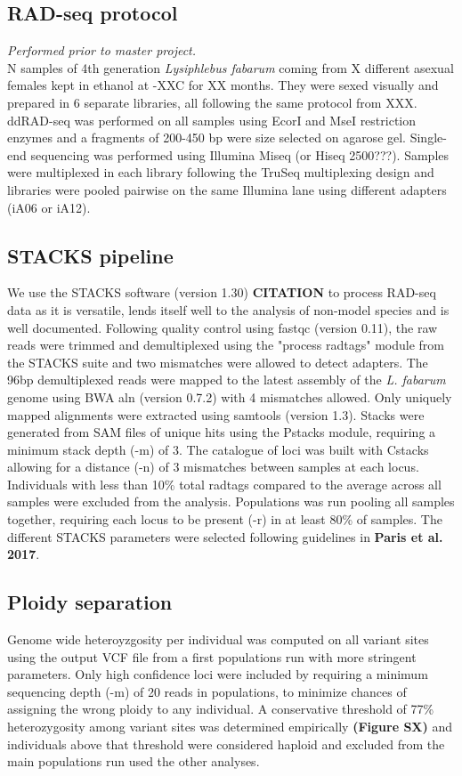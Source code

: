 \documentclass[11pt,a4paper]{report}
\begin{document}
\subsection*{RAD-seq protocol}
\textit{Performed prior to master project.}\\
N samples of 4th generation \textit{Lysiphlebus fabarum } coming from X different asexual females kept in ethanol at -XX\degree C for XX months. They were sexed visually and prepared in 6 separate libraries, all following the same protocol from XXX. ddRAD-seq was performed on all samples using EcorI and MseI restriction enzymes and a fragments  of 200-450 bp were size selected on agarose gel. Single-end sequencing was performed using Illumina Miseq (or Hiseq 2500???). Samples were multiplexed in each library following the TruSeq multiplexing design and libraries were pooled pairwise on the same Illumina lane using different adapters (iA06 or iA12).

\subsection*{STACKS pipeline}
We use the STACKS software (version 1.30) \textbf{CITATION} to process RAD-seq data as it is versatile, lends itself well to the analysis of non-model species and is well documented.
Following quality control using fastqc (version 0.11), the raw reads were trimmed and demultiplexed using the "process radtags" module from the STACKS suite and two mismatches were allowed to detect adapters. The 96bp demultiplexed reads were mapped to the latest assembly of the \textit{L. fabarum} genome using BWA aln (version 0.7.2) with 4 mismatches allowed. Only uniquely mapped alignments were extracted using samtools (version 1.3). Stacks were generated from SAM files of unique hits using the Pstacks module, requiring a minimum stack depth (-m) of 3. The catalogue of loci was built with Cstacks allowing for a distance (-n) of 3 mismatches between samples at each locus. Individuals with less than 10\% total radtags compared to the average across all samples were excluded from the analysis. Populations was run pooling all samples together, requiring each locus to be present (-r) in at least 80\% of samples. The different STACKS parameters were selected following guidelines in \textbf{Paris et al. 2017}.

\subsection*{Ploidy separation}
Genome wide heteroyzgosity per individual was computed on all variant sites using the output VCF file from a first populations run with more stringent parameters. Only high confidence loci were included by requiring a minimum sequencing depth (-m) of 20 reads in populations, to minimize chances of assigning the wrong ploidy to any individual. A conservative threshold of 77\% heterozygosity among variant sites was determined empirically \textbf{(Figure SX)} and individuals above that threshold were considered haploid and excluded from the main populations run used the other analyses.
\end{document}
